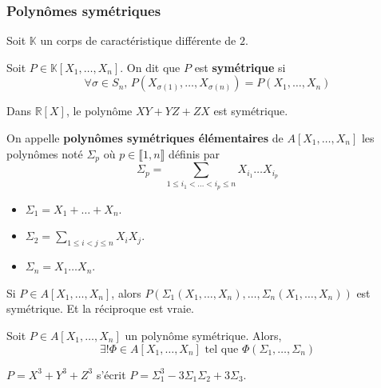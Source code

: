 	\subsubsection{Polynômes symétriques}
	
	
	Soit $\mathbb{K}$ un corps de caractéristique différente de $2$.
	
	\begin{definition}
		Soit $P \in \mathbb{K}[X_1, \dots, X_n]$. On dit que $P$ est \textbf{symétrique} si
		\[ \forall \sigma \in S_n, \, P(X_{\sigma(1)}, \dots, X_{\sigma(n)}) = P(X_1, \dots, X_n) \]
	\end{definition}
	
	\begin{example}
		Dans $\mathbb{R}[X]$, le polynôme $XY + YZ + ZX$ est symétrique.
	\end{example}
	
	\begin{definition}
		On appelle \textbf{polynômes symétriques élémentaires} de $A[X_1, \dots, X_n]$ les polynômes noté $\Sigma_p$ où $p \in \llbracket 1, n \rrbracket$ définis par
		\[ \Sigma_p = \sum_{1 \leq i_1 < \dots < i_p \leq n} X_{i_1} \dots X_{i_p} \]
	\end{definition}
	
	\begin{example}
		\begin{itemize}
			\item $\Sigma_1 = X_1 + \dots + X_n$.
			\item $\Sigma_2 = \sum_{1 \leq i < j \leq n} X_i X_j$.
			\item $\Sigma_n = X_1 \dots X_n$.
		\end{itemize}
	\end{example}
	
	\begin{remark}
		Si $P \in A[X_1, \dots, X_n]$, alors $P(\Sigma_1(X_1, \dots, X_n), \dots, \Sigma_n(X_1, \dots, X_n))$ est symétrique. Et la réciproque est vraie.
	\end{remark}
	
	\begin{theorem}
		Soit $P \in A[X_1, \dots, X_n]$ un polynôme symétrique. Alors,
		\[ \exists! \Phi \in A[X_1, \dots, X_n] \text{ tel que } \Phi(\Sigma_1, \dots, \Sigma_n) \]
	\end{theorem}
	
	\begin{example}
		$P = X^3 + Y^3 + Z^3$ s'écrit $P = \Sigma_1^3 - 3 \Sigma_1 \Sigma_2 + 3 \Sigma_3$.
	\end{example}
	
